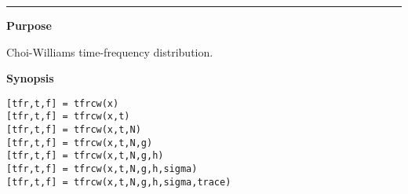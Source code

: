 

\hspace*{-1.6cm}{\Large \bf tfrcw}

\vspace*{-.4cm}
\hspace*{-1.6cm}\rule[0in]{16.5cm}{.02cm}
\vspace*{.2cm}

{\bf \large {}\selectfont Purpose}\\
\hspace*{1.5cm}
\begin{minipage}[t]{13.5cm}
Choi-Williams time-frequency distribution.
\end{minipage}
\vspace*{.5cm}

{\bf \large {}\selectfont Synopsis}\\
\hspace*{1.5cm}
\begin{minipage}[t]{13.5cm}
\begin{verbatim}
[tfr,t,f] = tfrcw(x)
[tfr,t,f] = tfrcw(x,t)
[tfr,t,f] = tfrcw(x,t,N)
[tfr,t,f] = tfrcw(x,t,N,g)
[tfr,t,f] = tfrcw(x,t,N,g,h)
[tfr,t,f] = tfrcw(x,t,N,g,h,sigma)
[tfr,t,f] = tfrcw(x,t,N,g,h,sigma,trace)
\end{verbatim}
\end{minipage}
\vspace*{.5cm}

